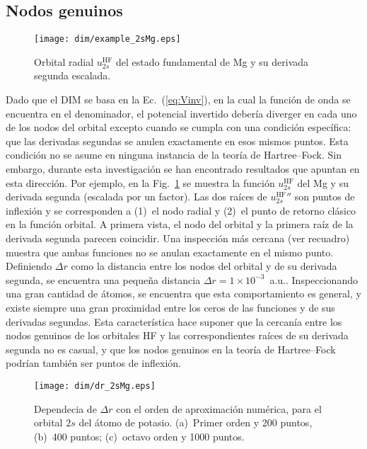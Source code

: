 \subsection{Nodos genuinos}
\label{subsec:nodosHF}

\begin{figure}[t]
\centering
\texttt{[image: dim/example\_2sMg.eps]} 
\caption[Orbital radial y su derivada segunda.]
{Orbital radial $u_{2s}^{\mathrm{HF}}$ del estado fundamental de Mg y su 
derivada segunda escalada.}
\label{fig:example2sMg}
\end{figure}

Dado que el DIM se basa en la Ec.~(\ref{eq:Vinv}), en la cual la función 
de onda se encuentra en el denominador, el potencial invertido debería 
diverger en cada uno de los nodos del orbital excepto cuando se cumpla 
con una condición específica: que las derivadas segundas se anulen 
exactamente en esos mismos puntos. Esta condición no se asume en ninguna 
instancia de la teoría de Hartree--Fock. Sin embargo, durante esta 
investigación se han encontrado resultados que apuntan en esta 
dirección. Por ejemplo, en la Fig.~\ref{fig:example2sMg} se muestra la 
función $u_{2s}^{\mathrm{HF}}$ del Mg y su derivada segunda (escalada 
por un factor). Las dos raíces de $u_{2s}^{\mathrm{HF}}''$ son puntos de 
inflexión y se corresponden a (1)~el nodo radial y (2)~el punto de 
retorno clásico en la función orbital. A primera vista, el nodo del 
orbital y la primera raíz de la derivada segunda parecen coincidir. Una 
inspección más cercana (ver recuadro) muestra que ambas funciones no se 
anulan exactamente en el mismo punto. Definiendo $\Delta r$ como la 
distancia entre los nodos del orbital y de su derivada segunda, se 
encuentra una pequeña distancia $\Delta r=1\times 10^{-3}$~a.u.. 
Inspeccionando una gran cantidad de átomos, se encuentra que esta 
comportamiento es general, y existe siempre una gran proximidad entre 
los ceros de las funciones y de sus derivadas segundas. Esta 
característica hace suponer que la cercanía entre los nodos genuinos de 
los orbitales HF y las correspondientes raíces de su derivada segunda 
no es casual, y que los nodos genuinos en la teoría de Hartree--Fock 
podrían también ser puntos de inflexión. 

\begin{figure}[t]
\centering
\texttt{[image: dim/dr\_2sMg.eps]} 
\caption{Dependecia de $\Delta r$ con el orden de aproximación numérica, 
para el orbital $2s$ del átomo de potasio. (a)~Primer orden y 200 
puntos, (b)~400 puntos; (c)~octavo orden y 1000 puntos.}
\label{fig:dr2sMg}
\end{figure}

